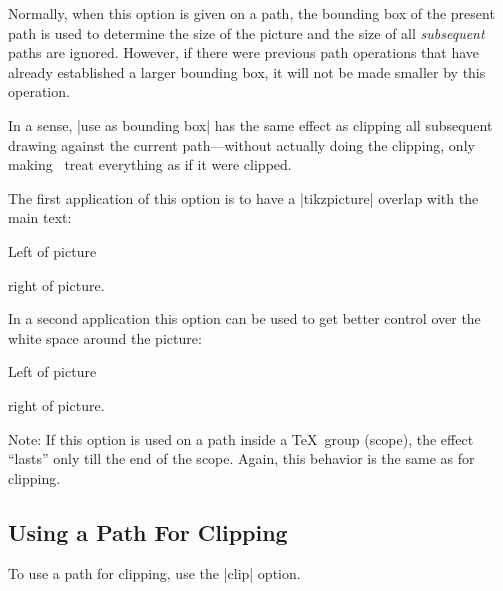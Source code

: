 \begin{itemize}
  Normally, when this option is given on a path, the bounding box of
  the present path is used to determine the size of the picture and
  the size of all \emph{subsequent} paths are
  ignored. However, if there were previous path operations that have
  already established a larger bounding box, it will not be made
  smaller by this operation.

  In a sense, |use as bounding box| has the same effect as clipping
  all subsequent drawing against the current path---without actually
  doing the clipping, only making \pgfname\ treat everything as if it
  were clipped.

  The first application of this option is to have a |{tikzpicture}|
  overlap with the main text:

\begin{codeexample}[]
Left of pictureright of picture.
\end{codeexample}

  In a second application this option can be used to get better
  control over the white space around the picture:
  
\begin{codeexample}[]
Left of picture
right of picture.
\end{codeexample}

  Note: If this option is used on a path inside a \TeX\ group (scope),
  the effect ``lasts'' only till the end of the scope. Again, this
  behavior is the same as for clipping.
\end{itemize}



\subsection{Using a Path For Clipping}

To use a path for clipping, use the |clip| option. 

